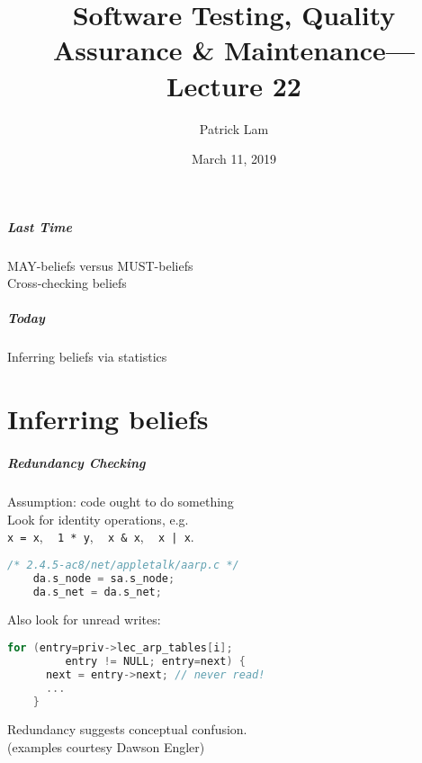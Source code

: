 \documentclass{beamer}
\title{Software Testing, Quality Assurance \& Maintenance---Lecture 22}
\author{Patrick Lam}
\date{March 11, 2019}
\newenvironment{changemargin}[1]{%
  \begin{list}{}{%
    \setlength{\topsep}{0pt}%
    \setlength{\leftmargin}{#1}%
    \setlength{\rightmargin}{1em}
    \setlength{\listparindent}{\parindent}%
    \setlength{\itemindent}{\parindent}%
    \setlength{\parsep}{\parskip}%
  }%
  \item[]}{\end{list}}
\begin{document}
\begin{frame}
  \titlepage
\end{frame}

\begin{frame}
  \frametitle{Last Time}

  \begin{changemargin}{2cm}
    MAY-beliefs versus MUST-beliefs\\[1em]
    Cross-checking beliefs
  \end{changemargin}
\end{frame}

\begin{frame}
\frametitle{Today}
\begin{changemargin}{2cm}
Inferring beliefs via statistics\\
\end{changemargin}
\end{frame}

\part{Inferring beliefs}
\frame{\partpage}

\begin{frame}[fragile]
\frametitle{Redundancy Checking}
  \begin{changemargin}{2cm}
    Assumption: code ought to do something\\[1em]
    Look for identity operations, e.g.\\
\hspace*{4em} {\tt x = x}, ~ {\tt 1 * y}, ~ {\tt x \& x}, ~ {\tt x | x}.\\
  \end{changemargin}
{\small
\begin{lstlisting}[language=C]
    /* 2.4.5-ac8/net/appletalk/aarp.c */
    da.s_node = sa.s_node;
    da.s_net = da.s_net;
\end{lstlisting}
}
  \begin{changemargin}{2cm}
    Also look for unread writes:\\
  \end{changemargin}

{\small \begin{lstlisting}[language=C]
    for (entry=priv->lec_arp_tables[i]; 
         entry != NULL; entry=next) {
      next = entry->next; // never read!
      ...
    }
\end{lstlisting} 
}
  \begin{changemargin}{2cm}
Redundancy suggests conceptual confusion.\\
\small \hfill (examples courtesy Dawson Engler)
 
  \end{changemargin}

\end{frame}
\end{document}
